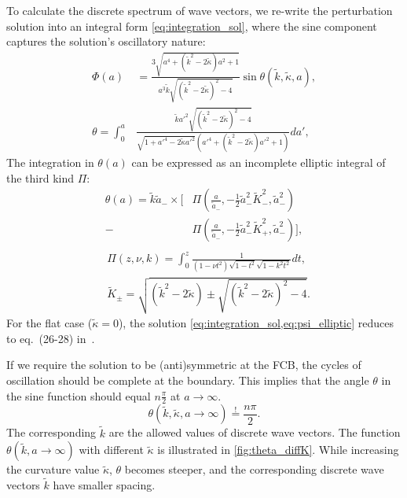 \documentclass[%
 reprint,
 amsmath,amssymb,
 prl,
]{revtex4-2}
\begin{document}
To calculate the discrete spectrum of wave vectors, we re-write the perturbation solution into an integral form \cref{eq:integration_sol}, where the sine component captures the solution's oscillatory nature:
\begin{equation}\label{eq:integration_sol}
\begin{aligned}
    \Phi(a) &= \frac{3\sqrt{a^4 + (\tilde{k}^2 -2\tilde\kappa)a^2 + 1}}{a^3\tilde{k}\sqrt{(\tilde{k}^2 -2\tilde\kappa)^2 - 4}} \sin\theta(\tilde k,\tilde\kappa,a),\\
    \theta = \int_0^a &\frac{\tilde{k} a'^2 \sqrt{(\tilde{k}^2 -2\tilde\kappa)^2 - 4}}{\sqrt{1 + a'^4 - 2\tilde\kappa a'^2} \left( a'^4 + (\tilde{k}^2 -2\tilde\kappa)a'^2 + 1 \right)} da',
\end{aligned}
\end{equation}
The integration in \(\theta(a)\) can be expressed as an incomplete elliptic integral of the third kind \(\Pi\):
\begin{equation}\label{eq:psi_elliptic}
\begin{aligned}
    \theta(a) = \tilde{k} \tilde a_- \times \Bigg[ &\Pi\left( \frac{a}{\tilde a_-}, -\frac{1}{2}\tilde a_-^2 \tilde K_{-}^2, \tilde a_-^2 \right) \\
    - &\Pi\left( \frac{a}{\tilde a_-}, -\frac{1}{2}\tilde a_-^2 \tilde K_{+}^2, \tilde a_-^2 \right) \Bigg],\\
\end{aligned}
\end{equation}
\vspace{-1.5em}
\begin{equation*}
\begin{aligned}
    &\Pi(z,\nu,k)=\int_0^z \frac{1}{(1-\nu t^2)\sqrt{1-t^2}\sqrt{1-k^2t^2}} dt,\\
    &\tilde K_{\pm}=\sqrt{(\tilde{k}^2 -2\tilde\kappa) \pm \sqrt{(\tilde{k}^2 -2\tilde\kappa)^2 - 4}}.
\end{aligned}
\end{equation*}
For the flat case (\(\tilde\kappa=0\)), the solution \cref{eq:integration_sol,eq:psi_elliptic} reduces to eq.~(26-28) in~\citet{2022PhRvD.105h3514L}.

If we require the solution to be (anti)symmetric at the FCB, the cycles of oscillation should be complete at the boundary. This implies that the angle \(\theta\) in the sine function should equal \( n\frac{\pi}{2} \) at \( a \rightarrow \infty \). 
\begin{equation}\label{eq:theta}
    \theta(\tilde{k}, \tilde\kappa, a \rightarrow \infty) \overset{!}{=} \frac{n\pi}{2}.
\end{equation}
The corresponding \(\tilde{k}\) are the allowed values of discrete wave vectors. The function \(\theta(\tilde k,a\rightarrow\infty)\) with different \(\tilde\kappa\) is illustrated in \cref{fig:theta_diffK}. While increasing the curvature value \(\tilde\kappa\), \(\theta\) becomes steeper, and the corresponding discrete wave vectors \(\tilde{k}\) have smaller spacing. 
\end{document}
